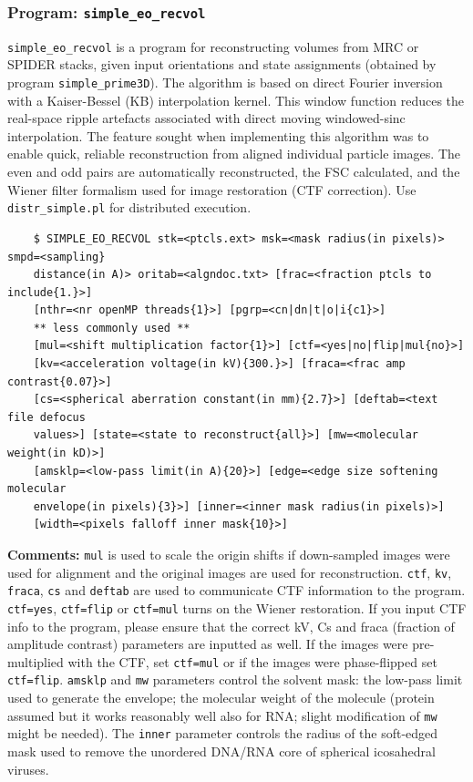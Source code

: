 \documentclass[a4paper,11pt]{article}
\newcommand{\prgname}[1]{\textcolor{NavyBlue}{\texttt{#1}}}
\begin{document}
\subsubsection{Program: \prgname{simple\_eo\_recvol}}
\label{eo_recvol}
\prgname{simple\_eo\_recvol} is a program for reconstructing volumes from MRC or SPIDER stacks, given input orientations and state assignments (obtained by program \prgname{simple\_prime3D}). The algorithm is based on direct Fourier inversion with a Kaiser-Bessel (KB) interpolation kernel. This window function reduces the real-space ripple artefacts associated with direct moving windowed-sinc interpolation. The feature sought when implementing this algorithm was to enable quick, reliable reconstruction from aligned individual particle images. The even and odd pairs are automatically reconstructed, the FSC calculated, and the Wiener filter formalism used for image restoration (CTF correction). Use \prgname{distr\_simple.pl} for distributed execution.
\begin{verbatim}
    $ SIMPLE_EO_RECVOL stk=<ptcls.ext> msk=<mask radius(in pixels)> smpd=<sampling}
    distance(in A)> oritab=<algndoc.txt> [frac=<fraction ptcls to include{1.}>]
    [nthr=<nr openMP threads{1}>] [pgrp=<cn|dn|t|o|i{c1}>]
    ** less commonly used **
    [mul=<shift multiplication factor{1}>] [ctf=<yes|no|flip|mul{no}>]
    [kv=<acceleration voltage(in kV){300.}>] [fraca=<frac amp contrast{0.07}>]
    [cs=<spherical aberration constant(in mm){2.7}>] [deftab=<text file defocus
    values>] [state=<state to reconstruct{all}>] [mw=<molecular weight(in kD)>]
    [amsklp=<low-pass limit(in A){20}>] [edge=<edge size softening molecular
    envelope(in pixels){3}>] [inner=<inner mask radius(in pixels)>]
    [width=<pixels falloff inner mask{10}>]
\end{verbatim}
\noindent\textbf{Comments:} \texttt{mul} is used to scale the origin shifts if down-sampled images were used for alignment and the original images are used for reconstruction. \texttt{ctf}, \texttt{kv}, \texttt{fraca}, \texttt{cs} and \texttt{deftab} are used to communicate CTF information to the program. \texttt{ctf=yes}, \texttt{ctf=flip} or \texttt{ctf=mul} turns on the Wiener restoration. If you input CTF info to the program, please ensure that the correct kV, Cs and fraca (fraction of amplitude contrast) parameters are inputted as well. If the images were pre-multiplied with the CTF, set \texttt{ctf=mul} or if the images were phase-flipped set \texttt{ctf=flip}. \texttt{amsklp} and \texttt{mw} parameters control the solvent mask: the low-pass limit used to generate the envelope; the molecular weight of the molecule (protein assumed but it works reasonably well also for RNA; slight modification of \texttt{mw} might be needed). The \texttt{inner} parameter controls the radius of the soft-edged mask used to remove the unordered DNA/RNA core of spherical icosahedral viruses.
\end{document}

